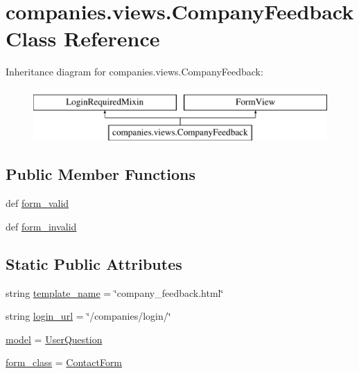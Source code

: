 \hypertarget{classcompanies_1_1views_1_1_company_feedback}{\section{companies.\-views.\-Company\-Feedback Class Reference}
\label{classcompanies_1_1views_1_1_company_feedback}
}
Inheritance diagram for companies.\-views.\-Company\-Feedback\-:\begin{figure}[H]
\begin{center}
\leavevmode
\includegraphics[height=2.000000cm]{classcompanies_1_1views_1_1_company_feedback}
\end{center}
\end{figure}
\subsection*{Public Member Functions}
\begin{DoxyCompactItemize}
\item 
def \hyperlink{classcompanies_1_1views_1_1_company_feedback_a299b2c735599b07f583207478e3ff81e}{form\-\_\-valid}
\item 
def \hyperlink{classcompanies_1_1views_1_1_company_feedback_ad33221bb25ba11f5ae702d06f9ca94da}{form\-\_\-invalid}
\end{DoxyCompactItemize}
\subsection*{Static Public Attributes}
\begin{DoxyCompactItemize}
\item 
string \hyperlink{classcompanies_1_1views_1_1_company_feedback_a5d925acfbfa5fe69e9383be85adbd500}{template\-\_\-name} = \char`\"{}company\-\_\-feedback.\-html\char`\"{}
\item 
string \hyperlink{classcompanies_1_1views_1_1_company_feedback_aa901529da10997e8b0fe618ffb2ca42c}{login\-\_\-url} = \char`\"{}/companies/login/\char`\"{}
\item 
\hyperlink{classcompanies_1_1views_1_1_company_feedback_a04f3ad8c8e16ae670cccd28be6f5f532}{model} = \hyperlink{classqueries_1_1models_1_1_user_question}{User\-Question}
\item 
\hyperlink{classcompanies_1_1views_1_1_company_feedback_afc3355f434a406261c348dccc8a7848a}{form\-\_\-class} = \hyperlink{classqueries_1_1forms_1_1_contact_form}{Contact\-Form}
\end{DoxyCompactItemize}


